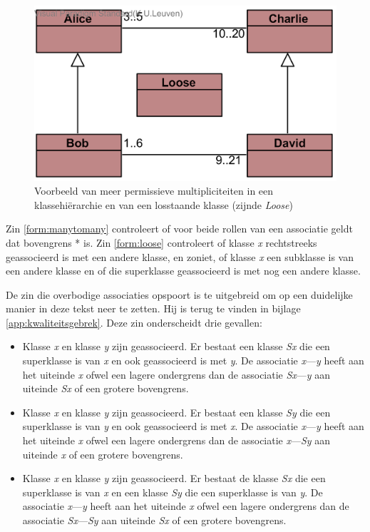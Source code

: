 \begin{figure}
	\centering
	\includegraphics{chap-kwaliteitsgebrek/hierarchy.png}
	\caption{Voorbeeld van meer permissieve multipliciteiten in een klassehi\"erarchie en van een losstaande klasse (zijnde \textit{Loose})}
	\label{fig:hierarchie}
\end{figure}

Zin \ref{form:manytomany} controleert of voor beide rollen van een associatie geldt dat bovengrens * is. Zin \ref{form:loose} controleert of klasse \textit{x} rechtstreeks geassocieerd is met een andere klasse, en zoniet, of klasse \textit{x} een subklasse is van een andere klasse en of die superklasse geassocieerd is met nog een andere klasse.

De zin die overbodige associaties opspoort is te uitgebreid om op een duidelijke manier in deze tekst neer te zetten. Hij is terug te vinden in bijlage \ref{app:kwaliteitsgebrek}.
Deze zin onderscheidt drie gevallen:

\begin{itemize}
	\item Klasse \textit{x} en klasse \textit{y} zijn geassocieerd. Er bestaat een klasse \textit{Sx} die een superklasse is van \textit{x} en ook geassocieerd is met \textit{y}. De associatie \textit{x}---\textit{y} heeft aan het uiteinde \textit{x} ofwel een lagere ondergrens dan de associatie \textit{Sx}---\textit{y} aan uiteinde \textit{Sx} of een grotere bovengrens.
	\item Klasse \textit{x} en klasse \textit{y} zijn geassocieerd. Er bestaat een klasse \textit{Sy} die een superklasse is van \textit{y} en ook geassocieerd is met \textit{x}. De associatie \textit{x}---\textit{y} heeft aan het uiteinde \textit{x} ofwel een lagere ondergrens dan de associatie \textit{x}---\textit{Sy} aan uiteinde \textit{x} of een grotere bovengrens.
	\item Klasse \textit{x} en klasse \textit{y} zijn geassocieerd. Er bestaat de klasse \textit{Sx} die een superklasse is van \textit{x} en een klasse \textit{Sy} die een superklasse is van \textit{y}. De associatie \textit{x}---\textit{y} heeft aan het uiteinde \textit{x} ofwel een lagere ondergrens dan de associatie \textit{Sx}---\textit{Sy} aan uiteinde \textit{Sx} of een grotere bovengrens.
\end{itemize}

